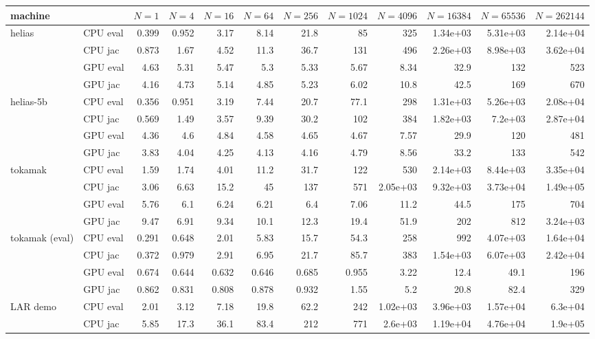 \begin{tabular}{llrrrrrrrrrr}
machine & & $N=1$ & $N=4$ & $N=16$ & $N=64$ & $N=256$ & $N=1024$ & $N=4096$ & $N=16384$ & $N=65536$ & $N=262144$ \\ \hline
helias & CPU eval & 0.399 & 0.952 & 3.17 & 8.14 & 21.8 & 85 & 325 & 1.34e+03 & 5.31e+03 & 2.14e+04 \\
 & CPU jac & 0.873 & 1.67 & 4.52 & 11.3 & 36.7 & 131 & 496 & 2.26e+03 & 8.98e+03 & 3.62e+04 \\
 & GPU eval & 4.63 & 5.31 & 5.47 & 5.3 & 5.33 & 5.67 & 8.34 & 32.9 & 132 & 523 \\
 & GPU jac & 4.16 & 4.73 & 5.14 & 4.85 & 5.23 & 6.02 & 10.8 & 42.5 & 169 & 670 \\
\hline
helias-5b & CPU eval & 0.356 & 0.951 & 3.19 & 7.44 & 20.7 & 77.1 & 298 & 1.31e+03 & 5.26e+03 & 2.08e+04 \\
 & CPU jac & 0.569 & 1.49 & 3.57 & 9.39 & 30.2 & 102 & 384 & 1.82e+03 & 7.2e+03 & 2.87e+04 \\
 & GPU eval & 4.36 & 4.6 & 4.84 & 4.58 & 4.65 & 4.67 & 7.57 & 29.9 & 120 & 481 \\
 & GPU jac & 3.83 & 4.04 & 4.25 & 4.13 & 4.16 & 4.79 & 8.56 & 33.2 & 133 & 542 \\
\hline
tokamak & CPU eval & 1.59 & 1.74 & 4.01 & 11.2 & 31.7 & 122 & 530 & 2.14e+03 & 8.44e+03 & 3.35e+04 \\
 & CPU jac & 3.06 & 6.63 & 15.2 & 45 & 137 & 571 & 2.05e+03 & 9.32e+03 & 3.73e+04 & 1.49e+05 \\
 & GPU eval & 5.76 & 6.1 & 6.24 & 6.21 & 6.4 & 7.06 & 11.2 & 44.5 & 175 & 704 \\
 & GPU jac & 9.47 & 6.91 & 9.34 & 10.1 & 12.3 & 19.4 & 51.9 & 202 & 812 & 3.24e+03 \\
\hline
tokamak (eval) & CPU eval & 0.291 & 0.648 & 2.01 & 5.83 & 15.7 & 54.3 & 258 & 992 & 4.07e+03 & 1.64e+04 \\
 & CPU jac & 0.372 & 0.979 & 2.91 & 6.95 & 21.7 & 85.7 & 383 & 1.54e+03 & 6.07e+03 & 2.42e+04 \\
 & GPU eval & 0.674 & 0.644 & 0.632 & 0.646 & 0.685 & 0.955 & 3.22 & 12.4 & 49.1 & 196 \\
 & GPU jac & 0.862 & 0.831 & 0.808 & 0.878 & 0.932 & 1.55 & 5.2 & 20.8 & 82.4 & 329 \\
\hline
LAR demo & CPU eval & 2.01 & 3.12 & 7.18 & 19.8 & 62.2 & 242 & 1.02e+03 & 3.96e+03 & 1.57e+04 & 6.3e+04 \\
 & CPU jac & 5.85 & 17.3 & 36.1 & 83.4 & 212 & 771 & 2.6e+03 & 1.19e+04 & 4.76e+04 & 1.9e+05 \\

\end{tabular}
